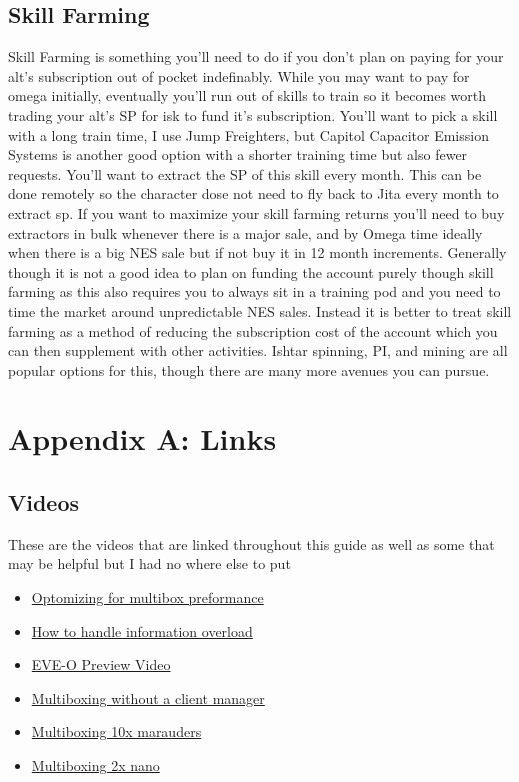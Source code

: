 \documentclass{article}
\begin{document}
\subsection{Skill Farming}
Skill Farming is something you'll need to do if you don't plan on paying for your alt's subscription out of pocket indefinably. While you may want to pay 
for omega initially, eventually you'll run out of skills to train so it becomes worth trading your alt's SP for isk to fund it's subscription. You'll want 
to pick a skill with a long train time, I use Jump Freighters, but Capitol Capacitor Emission Systems is another good option with a shorter training time 
but also fewer requests. You'll want to extract the SP of this skill every month. This can be done remotely so the character dose not need to fly back to 
Jita every month to extract sp. If you want to maximize your skill farming returns you'll need to buy extractors in bulk whenever there is a major sale, 
and by Omega time ideally when there is a big NES sale but if not buy it in 12 month increments. Generally though it is not a good idea to plan on funding
the account purely though skill farming as this also requires you to always sit in a training pod and you need to time the market around unpredictable NES
sales. Instead it is better to treat skill farming as a method of reducing the subscription cost of the account which you can then supplement with other
activities. Ishtar spinning, PI, and mining are all popular options for this, though there are many more avenues you can pursue.



\section*{Appendix A: Links}
\subsection*{Videos}
These are the videos that are linked throughout this guide as well as some that may be helpful but I had no where else to put
\begin{itemize}
  \item \href{https://www.youtube.com/watch?v=dKbQezW0ZwU}{Optomizing for multibox preformance}
  \item \href{https://www.youtube.com/watch?v=Lm4tVwSkBiE}{How to handle information overload}
  \item \href{https://www.youtube.com/watch?v=UpQpgcKSCS4}{EVE-O Preview Video}
  \item \href{https://www.youtube.com/watch?v=xpiYxq3mpD8}{Multiboxing without a client manager}
  \item \href{https://www.youtube.com/watch?v=iC8PwaFf8ck}{Multiboxing 10x marauders}
  \item \href{https://www.youtube.com/watch?v=p5WXd2IkaOc}{Multiboxing 2x nano}
\end{itemize}
\end{document}
